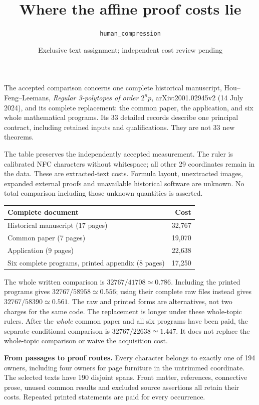 \documentclass[11pt]{article}
\title{Where the affine proof costs lie}\author{\texttt{human\_compression}}\date{Exclusive text assignment; independent cost review pending}
\begin{document}
\maketitle\vspace{-1em}
The accepted comparison concerns one complete historical manuscript,
Hou--Feng--Leemans, \emph{Regular 3-polytopes of order $2^np$},
arXiv:2001.02945v2 (14 July 2024), and its complete replacement: the common
paper, the application, and six whole mathematical programs. Its 33 detailed
records describe one principal contract, including retained inputs and
qualifications. They are not 33 new theorems.

The table preserves the independently accepted measurement. The ruler is
calibrated NFC characters without whitespace; all other 29 coordinates remain
in the data. These are extracted-text costs. Formula layout, unextracted
images, expanded external proofs and unavailable historical software are
unknown. No total comparison including those unknown quantities is asserted.
\begin{center}\begin{tabular}{@{}lr@{}}\toprule
Complete document & Cost \\\midrule
Historical manuscript (17 pages) & 32,767\\
Common paper (7 pages) & 19,070\\
Application (9 pages) & 22,638\\
Six complete programs, printed appendix (8 pages) & 17,250\\\bottomrule
\end{tabular}\end{center}
The whole written comparison is $32767/41708\simeq0.786$.
Including the printed programs gives $32767/58958\simeq0.556$;
using their complete raw files instead gives $32767/58390\simeq0.561$.
The raw and printed forms are alternatives, not two charges for the same code.
The replacement is longer under these whole-topic rulers.
After the \emph{whole} common paper and all six programs have been paid,
the separate conditional comparison is $32767/22638\simeq1.447$.
It does not replace the whole-topic comparison or waive the acquisition cost.

\textbf{From passages to proof routes.}
Every character belongs to exactly one of 194 owners, including four owners
for page furniture in the untrimmed coordinate. The selected texts have 190
disjoint spans. Front matter, references, connective prose, unused common
results and excluded source assertions all retain their costs. Repeated
printed statements are paid for every occurrence.
\end{document}
